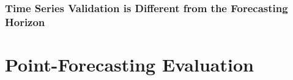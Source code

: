 \documentclass{beamer}
\begin{document}
\begin{frame}
  \frametitle{Time Series Validation is Different from the Forecasting Horizon}
  \end{frame}
  
\section{Point-Forecasting Evaluation}
\end{document}
